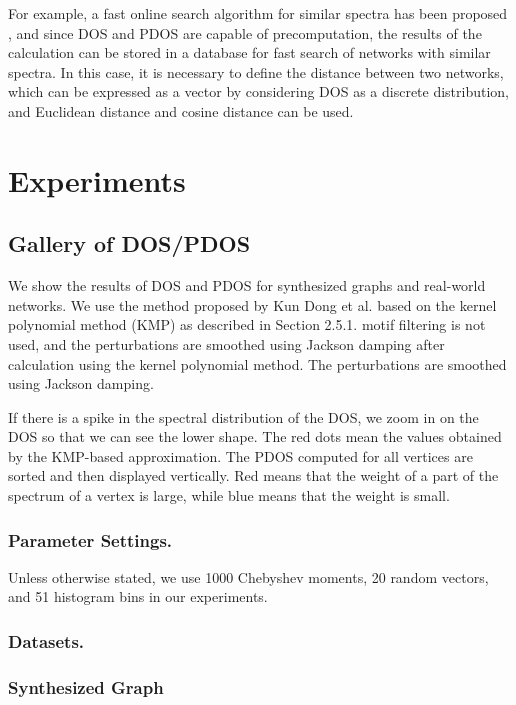 \documentclass[senior,final,11pt]{iscs-thesis}
\begin{document}
For example, a fast online search algorithm for similar spectra has been proposed \cite{borysov2018online,geilhufe2018towards}, and since DOS and PDOS are capable of precomputation, the results of the calculation can be stored in a database for fast search of networks with similar spectra. In this case, it is necessary to define the distance between two networks, which can be expressed as a vector by considering DOS as a discrete distribution, and Euclidean distance and cosine distance can be used.

\section{Experiments}
\subsection{Gallery of DOS/PDOS}
We show the results of DOS and PDOS for synthesized graphs and real-world networks. We use the method proposed by Kun Dong et al. based on the kernel polynomial method (KMP) as described in Section 2.5.1. motif filtering is not used, and the perturbations are smoothed using Jackson damping after calculation using the kernel polynomial method. The perturbations are smoothed using Jackson damping.

If there is a spike in the spectral distribution of the DOS, we zoom in on the DOS so that we can see the lower shape. The red dots mean the values obtained by the KMP-based approximation.
The PDOS computed for all vertices are sorted and then displayed vertically. Red means that the weight of a part of the spectrum of a vertex is large, while blue means that the weight is small.

\subsubsection*{Parameter Settings.}
Unless otherwise stated, we use 1000 Chebyshev moments, 20 random vectors, and 51 histogram bins in our experiments.

\subsubsection*{Datasets.}


\subsubsection{Synthesized Graph}
\end{document}
